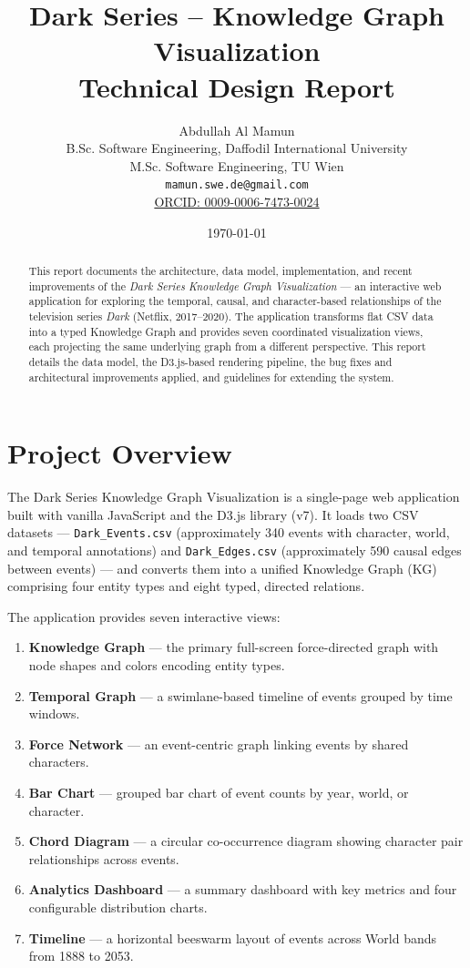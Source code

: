 \documentclass[11pt,a4paper]{article}
\title{\textbf{Dark Series -- Knowledge Graph Visualization}\\[4pt]
       \large Technical Design Report}
\author{Abdullah Al Mamun\\[2pt]
        \small B.Sc. Software Engineering, Daffodil International University\\[1pt]
        \small M.Sc. Software Engineering, TU Wien\\[1pt]
        \small \texttt{mamun.swe.de@gmail.com}\\[1pt]
        \small \href{https://orcid.org/0009-0006-7473-0024}{ORCID: 0009-0006-7473-0024}}
\date{\today}
\begin{document}
\maketitle

\begin{abstract}
This report documents the architecture, data model, implementation, and recent improvements of the \emph{Dark Series Knowledge Graph Visualization} --- an interactive web application for exploring the temporal, causal, and character-based relationships of the television series \emph{Dark} (Netflix, 2017--2020). The application transforms flat CSV data into a typed Knowledge Graph and provides seven coordinated visualization views, each projecting the same underlying graph from a different perspective. This report details the data model, the D3.js-based rendering pipeline, the bug fixes and architectural improvements applied, and guidelines for extending the system.
\end{abstract}

\tableofcontents
\newpage
\section{Project Overview}

The Dark Series Knowledge Graph Visualization is a single-page web application built with vanilla JavaScript and the D3.js library (v7). It loads two CSV datasets --- \texttt{Dark\_Events.csv} (approximately 340 events with character, world, and temporal annotations) and \texttt{Dark\_Edges.csv} (approximately 590 causal edges between events) --- and converts them into a unified Knowledge Graph (KG) comprising four entity types and eight typed, directed relations.

The application provides seven interactive views:
\begin{enumerate}[nosep]
    \item \textbf{Knowledge Graph} --- the primary full-screen force-directed graph with node shapes and colors encoding entity types.
    \item \textbf{Temporal Graph} --- a swimlane-based timeline of events grouped by time windows.
    \item \textbf{Force Network} --- an event-centric graph linking events by shared characters.
    \item \textbf{Bar Chart} --- grouped bar chart of event counts by year, world, or character.
    \item \textbf{Chord Diagram} --- a circular co-occurrence diagram showing character pair relationships across events.
    \item \textbf{Analytics Dashboard} --- a summary dashboard with key metrics and four configurable distribution charts.
    \item \textbf{Timeline} --- a horizontal beeswarm layout of events across World bands from 1888 to 2053.
\end{enumerate}
\end{document}
